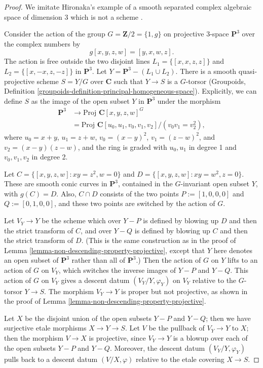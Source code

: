 \begin{proof}
We imitate Hironaka's example of a smooth separated complex
algebraic space of dimension 3
which is not a scheme \cite[Example B.3.4.2]{H}.

\medskip\noindent
Consider the action of the group $G = \mathbf{Z}/2 = \{1, g\}$
on projective 3-space
$\mathbf{P}^3$ over the complex numbers by
$$
g[x,y,z,w] = [y,x,w,z].
$$
The action is free outside the two disjoint lines
$L_1=\{ [x,x,z,z]\}$ and $L_2=\{ [x,-x,z,-z]\}$ in
${\mathbf P}^3$. Let $Y={\mathbf P}^3-(L_1\cup L_2)$. There is a
smooth quasi-projective scheme $S=Y/G$ over ${\mathbf C}$ such that
$Y\to S$ is a $G$-torsor (Groupoids,
Definition \ref{groupoids-definition-principal-homogeneous-space}).
Explicitly, we can define $S$ as the image of the open subset $Y$
in ${\mathbf P}^3$ under the morphism
\begin{align*}
{\mathbf P}^3 & \to \text{Proj } {\mathbf C}[x,y,z,w]^G\\
   & = \text{Proj } {\mathbf C}[u_0,u_1,v_0,v_1,v_2]/(v_0v_1=v_2^2),
\end{align*}
where $u_0=x+y$, $u_1=z+w$, $v_0=(x-y)^2$, $v_1=(z-w)^2$,
and $v_2=(x-y)(z-w)$, and the ring is graded with $u_0,u_1$
in degree 1 and $v_0,v_1,v_2$ in degree 2.

\medskip\noindent
Let $C=\{ [x,y,z,w]: xy=z^2, w=0\}$ and $D=\{ [x,y,z,w]:
xy=w^2, z=0\}$. These are smooth conic curves in ${\mathbf P}^3$, contained
in the $G$-invariant open subset $Y$, with $g(C)=D$. Also,
$C\cap D$ consists of the two points $P:=[1,0,0,0]$
and $Q:=[0,1,0,0]$, and these two points are switched by the action
of $G$. 

\medskip\noindent
Let $V_Y\to Y$ be the scheme which over $Y-P$
is defined by blowing up $D$ and then the strict transform
of $C$, and over $Y-Q$ is defined by blowing up $C$ and then
the strict transform of $D$. (This is the same construction
as in the proof of Lemma \ref{lemma-non-descending-property-projective},
except that $Y$ here denotes an open subset of ${\mathbf P}^3$
rather than all of ${\mathbf P}^3$.)
Then the action of $G$ on $Y$ lifts to an action of $G$ on $V_Y$,
which switches the inverse images of $Y-P$ and $Y-Q$. This action
of $G$ on $V_Y$ gives a descent datum $(V_Y/Y,\varphi_Y)$
on $V_Y$ relative to the $G$-torsor
$Y\to S$. The morphism $V_Y\to Y$
is proper but not projective, as shown in the proof
of Lemma \ref{lemma-non-descending-property-projective}.

\medskip\noindent
Let $X$ be the disjoint union of the open subsets $Y-P$ and $Y-Q$;
then we have surjective etale morphisms $X\to Y\to S$.
Let $V$ be the pullback of $V_Y\to Y$ to $X$; then the morphism
$V\to X$ is projective, since $V_Y\to Y$ is a blowup over each of the open
subsets $Y-P$ and $Y-Q$. Moreover, the descent datum $(V_Y/Y,\varphi_Y)$
pulls back to a descent datum $(V/X,\varphi)$ relative to the
etale covering $X\to S$.


\end{proof}
